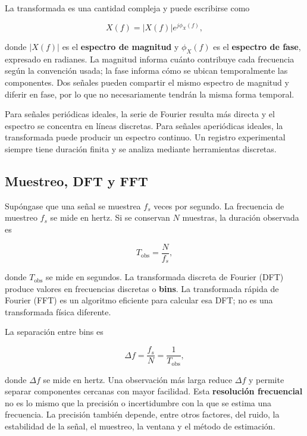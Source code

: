 La transformada es una cantidad compleja y puede escribirse como

\begin{equation}
    X(f)=\lvert X(f)\rvert e^{j\phi_X(f)},
    \label{eq:u5-magnitud-fase}
\end{equation}

donde \(\lvert X(f)\rvert\) es el \textbf{espectro de magnitud} y
\(\phi_X(f)\) es el \textbf{espectro de fase}, expresado en radianes. La
magnitud informa cuánto contribuye cada frecuencia según la convención usada;
la fase informa cómo se ubican temporalmente las componentes. Dos señales
pueden compartir el mismo espectro de magnitud y diferir en fase, por lo que
no necesariamente tendrán la misma forma temporal.

Para señales periódicas ideales, la serie de Fourier resulta más directa y el
espectro se concentra en líneas discretas. Para señales aperiódicas ideales,
la transformada puede producir un espectro continuo. Un registro experimental
siempre tiene duración finita y se analiza mediante herramientas discretas.

\subsection{Muestreo, DFT y FFT}
\label{sec:u5-dft-fft}

Supóngase que una señal se muestrea \(f_s\) veces por segundo. La frecuencia
de muestreo \(f_s\) se mide en hertz. Si se conservan \(N\) muestras, la
duración observada es

\begin{equation}
    T_\mathrm{obs}=\frac{N}{f_s},
    \label{eq:u5-duracion-registro}
\end{equation}

donde \(T_\mathrm{obs}\) se mide en segundos. La transformada discreta de
Fourier (DFT) produce valores en frecuencias discretas o \textbf{bins}. La
transformada rápida de Fourier (FFT) es un algoritmo eficiente para calcular
esa DFT; no es una transformada física diferente.

La separación entre bins es

\begin{equation}
    \Delta f=\frac{f_s}{N}
            =\frac{1}{T_\mathrm{obs}},
    \label{eq:u5-resolucion-frecuencial}
\end{equation}

donde \(\Delta f\) se mide en hertz. Una observación más larga reduce
\(\Delta f\) y permite separar componentes cercanas con mayor facilidad. Esta
\textbf{resolución frecuencial} no es lo mismo que la precisión o
incertidumbre con la que se estima una frecuencia. La precisión también
depende, entre otros factores, del ruido, la estabilidad de la señal, el
muestreo, la ventana y el método de estimación.

